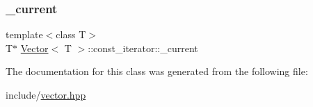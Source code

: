 \subsubsection{\texorpdfstring{\+\_\+current}{\_current}}
{\footnotesize\ttfamily template$<$class T$>$ \\
T$\ast$ \hyperlink{classVector}{Vector}$<$ T $>$\+::const\+\_\+iterator\+::\+\_\+current\hspace{0.3cm}{\ttfamily [protected]}}



The documentation for this class was generated from the following file\+:\begin{DoxyCompactItemize}
\item 
include/\hyperlink{vector_8hpp}{vector.\+hpp}\end{DoxyCompactItemize}
